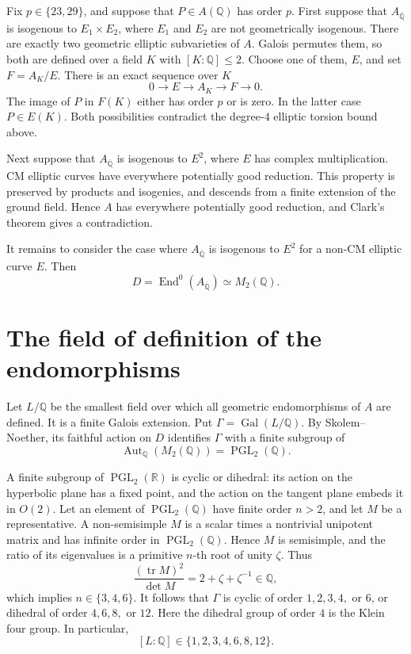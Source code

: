 \documentclass[11pt]{article}
\newcommand{\Q}{\mathbb Q}
\DeclareMathOperator{\End}{End}
\DeclareMathOperator{\Gal}{Gal}
\DeclareMathOperator{\PGL}{PGL}
\begin{document}
Fix \(p\in\{23,29\}\), and suppose that \(P\in A(\Q)\) has order \(p\).
First suppose that
\(A_{\overline{\Q}}\) is isogenous to \(E_1\times E_2\), where \(E_1\)
and \(E_2\) are not geometrically isogenous. There are exactly two
geometric elliptic subvarieties of \(A\). Galois permutes them, so
both are defined over a field \(K\) with \([K:\Q]\leq 2\).
Choose one of them, \(E\), and set \(F=A_K/E\). There is an exact
sequence over \(K\)
\[
 0\longrightarrow E\longrightarrow A_K\longrightarrow F
 \longrightarrow 0.
\]
The image of \(P\) in \(F(K)\) either has order \(p\) or is zero. In
the latter case \(P\in E(K)\). Both possibilities contradict the
degree-\(4\) elliptic torsion bound above.

Next suppose that \(A_{\overline{\Q}}\) is isogenous to \(E^2\), where
\(E\) has complex multiplication. CM elliptic curves have everywhere
potentially good reduction. This property is preserved by products
and isogenies, and descends from a finite extension of the ground
field. Hence \(A\) has everywhere potentially good reduction, and
Clark's theorem gives a contradiction.

It remains to consider the case where
\(A_{\overline{\Q}}\) is isogenous to \(E^2\) for a non-CM elliptic
curve \(E\). Then
\[
 D=\End^0(A_{\overline{\Q}})\simeq M_2(\Q).
\]

\section{The field of definition of the endomorphisms}

Let \(L/\Q\) be the smallest field over which all geometric
endomorphisms of \(A\) are defined. It is a finite Galois extension.
Put \(\Gamma=\Gal(L/\Q)\). By Skolem--Noether, its faithful action
on \(D\) identifies \(\Gamma\) with a finite subgroup of
\[
 \operatorname{Aut}_{\Q}(M_2(\Q))=\PGL_2(\Q).
\]

A finite subgroup of \(\PGL_2(\mathbb R)\) is cyclic or dihedral:
its action on the hyperbolic plane has a fixed point, and the action
on the tangent plane embeds it in \(O(2)\). Let an element of
\(\PGL_2(\Q)\) have finite order \(n>2\), and let \(M\) be a
representative. A non-semisimple \(M\) is a scalar times a nontrivial
unipotent matrix and has infinite order in \(\PGL_2(\Q)\). Hence \(M\)
is semisimple, and the ratio of its eigenvalues is a primitive
\(n\)-th root of unity \(\zeta\).
Thus
\[
 \frac{(\operatorname{tr}M)^2}{\det M}
 =2+\zeta+\zeta^{-1}\in\Q,
\]
which implies \(n\in\{3,4,6\}\). It follows that \(\Gamma\) is cyclic
of order \(1,2,3,4,\) or \(6\), or dihedral of order \(4,6,8,\) or
\(12\). Here the dihedral group of order \(4\) is the Klein four
group. In particular,
\[
 [L:\Q]\in\{1,2,3,4,6,8,12\}.
\]
\end{document}
